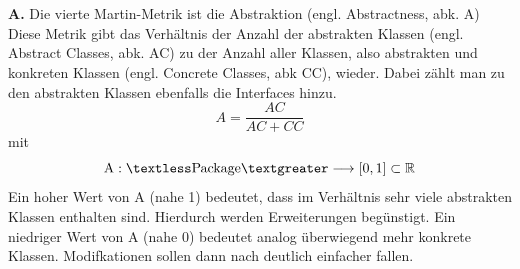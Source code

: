 \documentclass[12pt]{article}
\begin{document}

%
~\\
\\
\textbf{A.}\label{A} Die vierte Martin-Metrik ist die Abstraktion
(engl. Abstractness, abk. A) Diese Metrik gibt das Verhältnis der
Anzahl der abstrakten Klassen (engl. Abstract Classes, abk. AC)
zu der Anzahl aller Klassen, also abstrakten und konkreten
Klassen (engl.  Concrete Classes, abk CC), wieder. Dabei zählt
man zu den abstrakten Klassen ebenfalls die Interfaces hinzu.
\[
        A = \frac{AC}{AC + CC}
\]
mit
\[
        \text{A}: \textless \text{Package} \textgreater
        \longrightarrow [0,1] \subset \mathbb{R}
\]
Ein hoher Wert von A (nahe 1) bedeutet, dass im Verhältnis sehr
viele abstrakten Klassen enthalten sind. Hierdurch werden
Erweiterungen begünstigt.  Ein niedriger Wert von A (nahe 0)
bedeutet analog überwiegend mehr konkrete Klassen. Modifkationen
sollen dann nach \cite{Mar94} deutlich einfacher fallen. 
~\\
\\
\end{document}
